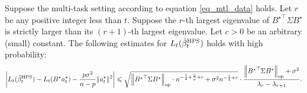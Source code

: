 \begin{theorem}\label{thm_many_tasks}
Suppose the multi-task setting according to equation \eqref{eq_mtl_data} holds.
Let $r$ be any positive integer less than $t$.
Suppose the $r$-th largest eigenvalue of ${B^\star}^\top \Sigma B^\star$ is strictly larger than its $(r+1)$-th largest eigenvalue. 
Let $c>0$ be an arbitrary (small) constant.
The following estimates for $L_t(\hat{\beta}_t^{\textup{HPS}})$ holds with high probability:
\begin{align}
	\bigabs{L_t(\hat{\beta}_t^{\MTL}) - L_t(B^{\star}a_t^{\star}) -\frac{p\sigma^2}{n-p}  \norm{a_t^{\star}}^2  } 
	\le  \sqrt{\bignorm{{B^\star}^\top\Sigma B^\star}_{\op} \cdot n^{-\frac 1 2+ \frac 2{\varphi} + c}  + \sigma^2 n^{-\frac 1 2 + c}} \cdot \frac{\bignorm{{B^\star}^\top\Sigma B^\star}_{\op}+  \sigma^2}{\lambda_r - \lambda_{r+1}}. \label{Li_multi1}
\end{align}
\end{theorem}


